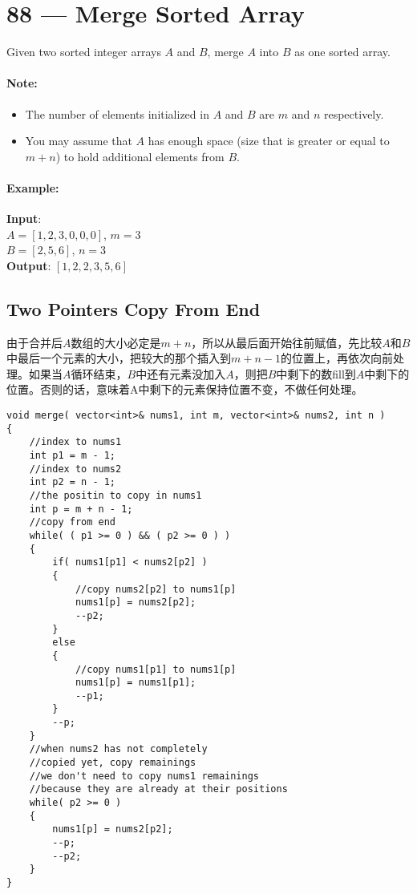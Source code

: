 \section{88 --- Merge Sorted Array}
Given two sorted integer arrays $A$ and $B$, merge $A$ into $B$ as one sorted array.
\paragraph{Note:}
\begin{itemize}
    \item The number of elements initialized in $A$ and $B$ are $m$ and $n$ respectively.
    \item You may assume that $A$ has enough space (size that is greater or equal to $m + n$) to hold additional elements from $B$.
\end{itemize}
\paragraph{Example:}
\begin{flushleft}
\textbf{Input}:
\\
$A = [1,2,3,0,0,0]$, $m = 3$
\\
$B = [2,5,6]$, $n = 3$
\\
\textbf{Output}: $[1,2,2,3,5,6]$
\end{flushleft}
\subsection{Two Pointers Copy From End}
由于合并后$A$数组的大小必定是$m+n$，所以从最后面开始往前赋值，先比较$A$和$B$中最后一个元素的大小，把较大的那个插入到$m+n-1$的位置上，再依次向前处理。如果当$A$循环结束，$B$中还有元素没加入$A$，则把$B$中剩下的数fill到$A$中剩下的位置。否则的话，意味着A中剩下的元素保持位置不变，不做任何处理。

\setcounter{lstlisting}{0}
\begin{lstlisting}[style=customc, caption={Two Pointers}]
void merge( vector<int>& nums1, int m, vector<int>& nums2, int n )
{
    //index to nums1
    int p1 = m - 1;
    //index to nums2
    int p2 = n - 1;
    //the positin to copy in nums1
    int p = m + n - 1;
    //copy from end
    while( ( p1 >= 0 ) && ( p2 >= 0 ) )
    {
        if( nums1[p1] < nums2[p2] )
        {
            //copy nums2[p2] to nums1[p]
            nums1[p] = nums2[p2];
            --p2;
        }
        else
        {
            //copy nums1[p1] to nums1[p]
            nums1[p] = nums1[p1];
            --p1;
        }
        --p;
    }
    //when nums2 has not completely
    //copied yet, copy remainings
    //we don't need to copy nums1 remainings
    //because they are already at their positions
    while( p2 >= 0 )
    {
        nums1[p] = nums2[p2];
        --p;
        --p2;
    }
}
\end{lstlisting}
